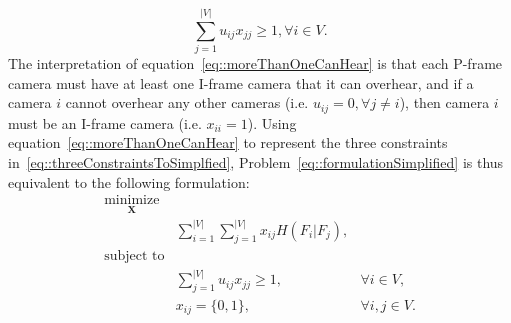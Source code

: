 \begin{equation}
\sum_{j=1}^{|V|} u_{ij} x_{jj} \geq 1, \forall i \in V.
\label{eq::moreThanOneCanHear}
\end{equation}
The interpretation of equation~\eqref{eq::moreThanOneCanHear} is that each P-frame camera must have at least one I-frame camera that it can overhear, and if a camera $i$ cannot overhear any other cameras (i.e. $u_{ij} = 0, \forall j \neq i$), then camera $i$ must be an I-frame camera (i.e. $x_{ii}=1$).
Using equation~\eqref{eq::moreThanOneCanHear} to represent the three constraints in~\eqref{eq::threeConstraintsToSimplfied}, Problem~\eqref{eq::formulationSimplified} is thus equivalent to the following formulation:
\begin{align}
\underset{\mathbf{X}}{\text{minimize}} & & \nonumber \\
	&\sum_{i=1}^{|V|} \sum_{j=1}^{|V|}  x_{ij} H(F_i|F_j), & \nonumber \\
\text{subject to} & & \nonumber \\
	&\sum_{j=1}^{|V|} u_{ij} x_{jj} \geq 1, &\forall i \in V, \nonumber \\
	&x_{ij} = \{0,1\}, &\forall i,j \in V.
\label{eq::formulationSimplifiedAsGraph}
\end{align}

